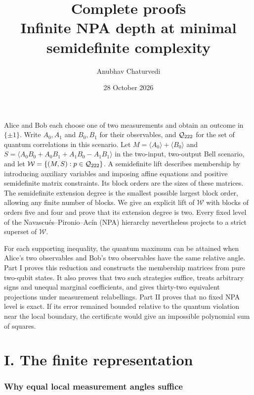 \documentclass[11pt]{article}
\title{Complete proofs\\Infinite NPA depth at minimal semidefinite complexity}
\author{Anubhav Chaturvedi}\date{28 October 2026}
\theoremstyle{remark}\newtheorem{remark}[theorem]{Remark}
\newcommand{\W}{\mathcal W}\newcommand{\sxdeg}{\operatorname{sxdeg}}
\begin{document}
\maketitle

Alice and Bob each choose one of two measurements and obtain an outcome
in $\{\pm1\}$. Write $A_0,A_1$ and $B_0,B_1$ for their observables,
and $\mathcal Q_{222}$ for the set of quantum correlations in this scenario.
Let $M=\langle A_0\rangle+\langle B_0\rangle$ and
$S=\langle A_0B_0+A_0B_1+A_1B_0-A_1B_1\rangle$ in the two-input,
two-output Bell scenario, and let $\W=\{(M,S):p\in\Q_{222}\}$.
A semidefinite lift describes membership by introducing auxiliary variables
and imposing affine equations and positive semidefinite matrix constraints.
Its block orders are the sizes of these matrices. The semidefinite extension
degree is the smallest possible largest block order, allowing any finite
number of blocks. We give an explicit lift of $\W$ with blocks of orders
five and four and prove that its extension degree is two. Every fixed level
of the Navascu\'es--Pironio--Ac\'in (NPA) hierarchy nevertheless projects
to a strict superset of $\W$.

For each supporting inequality, the quantum maximum can be attained when
Alice's two observables and Bob's two observables have the same relative
angle. Part I proves this reduction and constructs the membership matrices
from pure two-qubit states. It also proves that two such strategies suffice,
treats arbitrary signs and unequal marginal coefficients, and gives
thirty-two equivalent projections under measurement relabellings.
Part II proves that no fixed NPA level is exact. If its error remained
bounded relative to the quantum violation near the local boundary,
the certificate would give an impossible polynomial sum of squares.

\part*{I. The finite representation}
\renewcommand{\thesection}{F\arabic{section}}
\renewcommand{\thesubsection}{\thesection.\arabic{subsection}}
\renewcommand{\theequation}{F\arabic{equation}}
\renewcommand{\thetheorem}{F\arabic{theorem}}
\renewcommand{\theHequation}{F.\arabic{equation}}
\renewcommand{\theHsection}{F.\arabic{section}}
\section{Why equal local measurement angles suffice}
\end{document}

